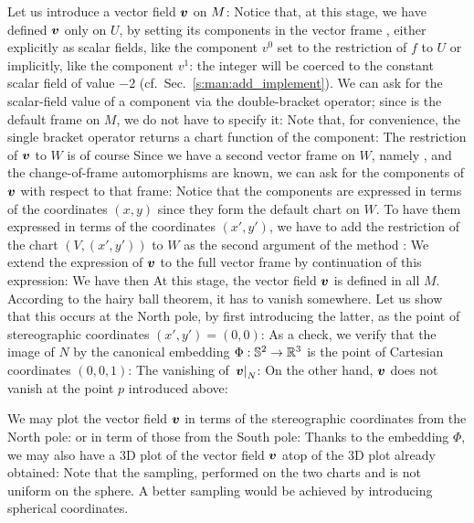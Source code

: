Let us introduce a vector field $\bm{v}$ on $M$:
Notice that, at this stage, we have defined $\bm{v}$ only on $U$, by setting
its components in the vector frame , either explicitly as scalar
fields, like the component $v^0$ set to the restriction of $f$ to $U$ or
implicitly, like the component $v^1$: the integer 
will be coerced to the constant scalar field of value $-2$ (cf.\ Sec.~\ref{s:man:add_implement}).
We can ask for the scalar-field value of a component via the double-bracket
operator; since  is the default frame on $M$, we do not have to specify
it:
Note that, for convenience, the single bracket operator returns a chart function
of the component:
The restriction of $\bm{v}$ to $W$ is of course
Since we have a second vector frame on $W$, namely , and the
change-of-frame automorphisms are known, we can ask for the components
of $\bm{v}$ with respect to that frame:
Notice that the components are expressed in terms of the coordinates $(x,y)$
since they form the default chart on $W$. To have them expressed in
terms of the coordinates $(x',y')$, we have to add the restriction of
the chart
$(V,(x',y'))$ to $W$ as the second argument of the method
:
We extend the expression of $\bm{v}$ to the full vector frame 
by continuation of this expression:
We have then
At this stage, the vector field $\bm{v}$ is defined in all $M$.
According to the hairy ball theorem, it has to vanish somewhere.
Let us show that this occurs at the North pole, by first introducing the
latter, as the point of stereographic coordinates $(x',y')=(0,0)$:
As a check, we verify that the image of $N$ by the canonical embedding
$\Phi: \mathbb{S}^2 \to \mathbb{R}^3$ is the point of Cartesian coordinates $(0,0,1)$:
The vanishing of $\left.\bm{v}\right| _N$:
On the other hand, $\bm{v}$ does not vanish at the point $p$ introduced above:

We may plot the vector field $\bm{v}$ in terms of the stereographic coordinates
from the North pole:
or in term of those from the South pole:
Thanks to the embedding $\Phi$, we may also have a 3D plot of the vector
field $\bm{v}$
atop of the 3D plot already obtained:
Note that the sampling, performed on the two charts  and 
is not uniform on the sphere. A better sampling would be achieved by introducing
spherical coordinates.

